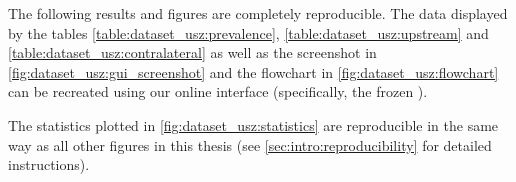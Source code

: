 \begin{tcolorbox}[
    title=\faIcon{recycle} Reproducibility,
    parbox=false,
    float
]
    The following results and figures are completely reproducible. The data displayed by the tables \cref{table:dataset_usz:prevalence}, \cref{table:dataset_usz:upstream} and \cref{table:dataset_usz:contralateral} as well as the screenshot in \cref{fig:dataset_usz:gui_screenshot} and the flowchart in \cref{fig:dataset_usz:flowchart} can be recreated using our online interface \inlinelyproxlogo{} (specifically, the frozen ).
    
    The statistics plotted in \cref{fig:dataset_usz:statistics} are reproducible in the same way as all other figures in this thesis (see \cref{sec:intro:reproducibility} for detailed instructions).
\end{tcolorbox}
